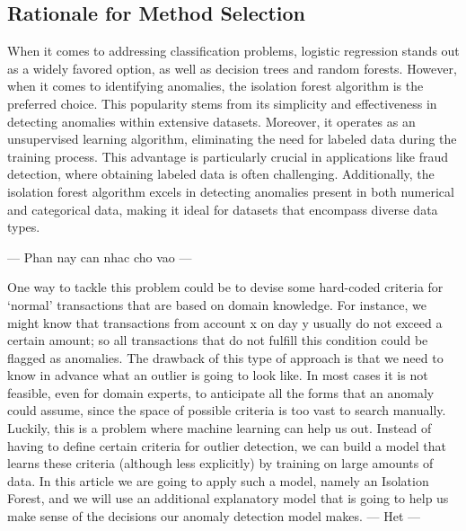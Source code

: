 \subsection{Rationale for Method Selection}
When it comes to addressing classification problems, logistic regression stands out as a widely favored option, as well as decision trees and random forests. However, when it comes to identifying anomalies, the isolation forest algorithm is the preferred choice. This popularity stems from its simplicity and effectiveness in detecting anomalies within extensive datasets. Moreover, it operates as an unsupervised learning algorithm, eliminating the need for labeled data during the training process. This advantage is particularly crucial in applications like fraud detection, where obtaining labeled data is often challenging. Additionally, the isolation forest algorithm excels in detecting anomalies present in both numerical and categorical data, making it ideal for datasets that encompass diverse data types.

--- Phan nay can nhac cho vao ---

One way to tackle this problem could be to devise some hard-coded criteria for ‘normal’ transactions that are based on domain knowledge. For instance, we might know that transactions from account x on day y usually do not exceed a certain amount; so all transactions that do not fulfill this condition could be flagged as anomalies. The drawback of this type of approach is that we need to know in advance what an outlier is going to look like. In most cases it is not feasible, even for domain experts, to anticipate all the forms that an anomaly could assume, since the space of possible criteria is too vast to search manually. Luckily, this is a problem where machine learning can help us out. Instead of having to define certain criteria for outlier detection, we can build a model that learns these criteria (although less explicitly) by training on large amounts of data. In this article we are going to apply such a model, namely an Isolation Forest, and we will use an additional explanatory model that is going to help us make sense of the decisions our anomaly detection model makes.
--- Het ---
